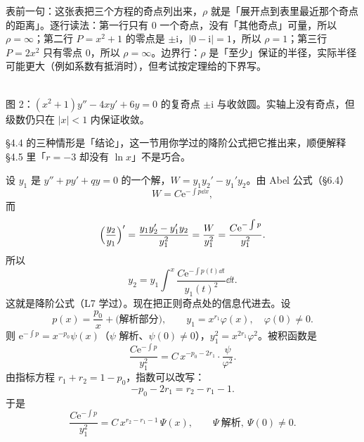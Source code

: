 \documentclass[11pt]{ctexart}
\newcommand{\ii}{\mathrm{i}}
\newcommand{\ee}{\mathrm{e}}
\begin{document}
表前一句：这张表把三个方程的奇点列出来，$\rho$ 就是「展开点到表里最近那个奇点的距离」。逐行读法：第一行只有 $0$ 一个奇点，没有「其他奇点」可量，所以 $\rho=\infty$；第二行 $P=x^2+1$ 的零点是 $\pm\ii$，$|0-\ii|=1$，所以 $\rho=1$；第三行 $P=2x^2$ 只有零点 $0$，所以 $\rho=\infty$。边界行：$\rho$ 是「至少」保证的半径，实际半径可能更大（例如系数有抵消时），但考试按定理给的下界写。

\begin{center}
\\[2pt]
{\small\color{inkgray}图 2：$(x^2+1)y''-4xy'+6y=0$ 的复奇点 $\pm\ii$ 与收敛圆。实轴上没有奇点，但级数仍只在 $|x|<1$ 内保证收敛。}
\end{center}



§4.4 的三种情形是「结论」，这一节用你学过的降阶公式把它推出来，顺便解释 §4.5 里「$r=-3$ 却没有 $\ln x$」不是巧合。

设 $y_1$ 是 $y''+py'+qy=0$ 的一个解，$W=y_1y_2'-y_1'y_2$。由 Abel 公式（§6.4）
\[
W=C\ee^{-\int p\dd x},
\]
而
\[
\Bigl(\frac{y_2}{y_1}\Bigr)'=\frac{y_1y_2'-y_1'y_2}{y_1^2}=\frac{W}{y_1^2}
=\frac{C\ee^{-\int p}}{y_1^2}.
\]
所以
\[
y_2=y_1\int^x\frac{C\ee^{-\int p(t)\dd t}}{y_1(t)^2}\dd t . \tag{4.7}
\]
这就是降阶公式（L7 学过）。现在把正则奇点处的信息代进去。设
\[
p(x)=\frac{p_0}{x}+\text{(解析部分)},\qquad y_1=x^{r_1}\varphi(x),\quad \varphi(0)\neq0 .
\]
则 $\ee^{-\int p}=x^{-p_0}\psi(x)$（$\psi$ 解析、$\psi(0)\neq0$），$y_1^2=x^{2r_1}\varphi^2$。被积函数是
\[
\frac{C\ee^{-\int p}}{y_1^2}=C\,x^{-p_0-2r_1}\cdot\frac{\psi}{\varphi^2}.
\]
由指标方程 $r_1+r_2=1-p_0$，指数可以改写：
\[
-p_0-2r_1=r_2-r_1-1 .
\]
于是
\[
\frac{C\ee^{-\int p}}{y_1^2}=C\,x^{r_2-r_1-1}\,\Psi(x),\qquad \Psi\ \text{解析},\ \Psi(0)\neq0 . \tag{4.8}
\]
\end{document}
